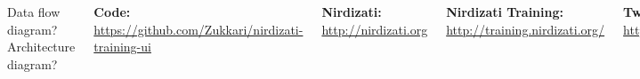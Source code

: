 \documentclass[24pt, a0paper, landscape]{tikzposter}
\begin{document}
\begin{columns}
{        \begin{tikzfigure}
            \includegraphics[scale=0.65]{figures/model_overview.png}
        \end{tikzfigure}
        }

        {
        Data flow diagram?
        Architecture diagram?
        }

        {
        \textbf{Code:} \href{https://github.com/Zukkari/nirdizati-training-ui}{\url{https://github.com/Zukkari/nirdizati-training-ui}}
        \bigbreak

        \textbf{Nirdizati:} \href{http://nirdizati.org/}{\url{http://nirdizati.org}}
        \bigbreak

        \textbf{Nirdizati Training:} \href{http://training.nirdizati.org/}{\url{http://training.nirdizati.org/}}
        \bigbreak

        \textbf{Twitter:} \href{https://twitter.com/nirdizati}{\url{https://twitter.com/nirdizati}}
        }
    \end{columns}
\end{document}
